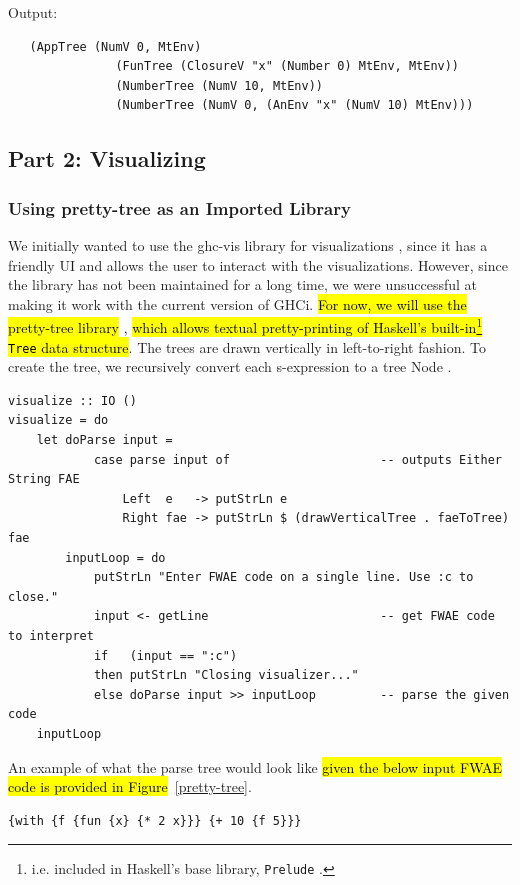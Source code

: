 \documentclass[format=acmlarge, review=false, nonacm=false, screen=true]{acmart}
\begin{document}
Output:
\begin{verbatim}
   (AppTree (NumV 0, MtEnv)
               (FunTree (ClosureV "x" (Number 0) MtEnv, MtEnv))
               (NumberTree (NumV 10, MtEnv))
               (NumberTree (NumV 0, (AnEnv "x" (NumV 10) MtEnv)))
\end{verbatim}

\subsection{Part 2: Visualizing}

\subsubsection{Using pretty-tree as an Imported Library}
We initially wanted to use the ghc-vis library for visualizations \cite{ghc-vis}, since it has a friendly UI and allows the user to interact with the visualizations. However, since the library has not been maintained for a long time, we were unsuccessful at making it work with the current version of GHCi. \hl{For now, we will use the pretty-tree library} \cite{pretty-tree}, \hl{which allows textual pretty-printing of Haskell's built-in\footnote{i.e. included in Haskell's base library, \texttt{Prelude} \cite{prelude}.} \texttt{Tree} data structure}. The trees are drawn vertically in left-to-right fashion. To create the tree, we recursively convert each s-expression to a tree Node \cite{data-tree}.
\begin{verbatim}
visualize :: IO ()
visualize = do
    let doParse input =
            case parse input of                     -- outputs Either String FAE
                Left  e   -> putStrLn e
                Right fae -> putStrLn $ (drawVerticalTree . faeToTree) fae
        inputLoop = do
            putStrLn "Enter FWAE code on a single line. Use :c to close."
            input <- getLine                        -- get FWAE code to interpret
            if   (input == ":c")                    
            then putStrLn "Closing visualizer..."
            else doParse input >> inputLoop         -- parse the given code
    inputLoop
\end{verbatim}

An example of what the parse tree would look like \hl{given the below input FWAE code is provided in Figure}~\ref{pretty-tree}.

\begin{verbatim}
{with {f {fun {x} {* 2 x}}} {+ 10 {f 5}}}
\end{verbatim}
\end{document}
